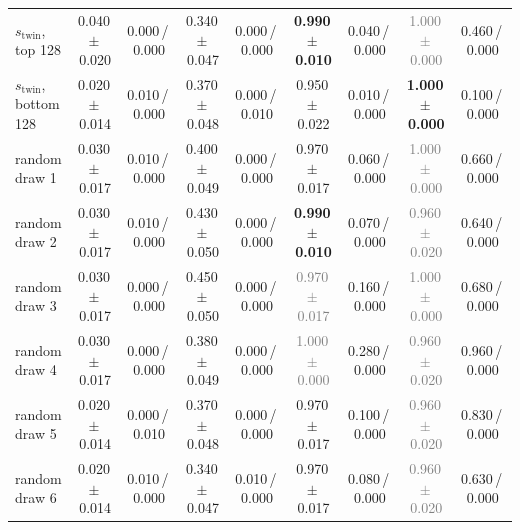 \begin{tabular}{@{}lcccccccc@{}}
$s_{\text{twin}}$, top 128 & 0.040\,{\scriptsize$\pm$\,0.020} & {\scriptsize 0.000\,/\,0.000} & 0.340\,{\scriptsize$\pm$\,0.047} & {\scriptsize 0.000\,/\,0.000} & \textbf{0.990\,{\scriptsize$\pm$\,0.010}} & {\scriptsize 0.040\,/\,0.000} & \textcolor{gray}{1.000\,{\scriptsize$\pm$\,0.000}} & {\scriptsize 0.460\,/\,0.000} \\
$s_{\text{twin}}$, bottom 128 & 0.020\,{\scriptsize$\pm$\,0.014} & {\scriptsize 0.010\,/\,0.000} & 0.370\,{\scriptsize$\pm$\,0.048} & {\scriptsize 0.000\,/\,0.010} & 0.950\,{\scriptsize$\pm$\,0.022} & {\scriptsize 0.010\,/\,0.000} & \textbf{1.000\,{\scriptsize$\pm$\,0.000}} & {\scriptsize 0.100\,/\,0.000} \\
\midrule
random draw 1 & 0.030\,{\scriptsize$\pm$\,0.017} & {\scriptsize 0.010\,/\,0.000} & 0.400\,{\scriptsize$\pm$\,0.049} & {\scriptsize 0.000\,/\,0.000} & 0.970\,{\scriptsize$\pm$\,0.017} & {\scriptsize 0.060\,/\,0.000} & \textcolor{gray}{1.000\,{\scriptsize$\pm$\,0.000}} & {\scriptsize 0.660\,/\,0.000} \\
random draw 2 & 0.030\,{\scriptsize$\pm$\,0.017} & {\scriptsize 0.010\,/\,0.000} & 0.430\,{\scriptsize$\pm$\,0.050} & {\scriptsize 0.000\,/\,0.000} & \textbf{0.990\,{\scriptsize$\pm$\,0.010}} & {\scriptsize 0.070\,/\,0.000} & \textcolor{gray}{0.960\,{\scriptsize$\pm$\,0.020}} & {\scriptsize 0.640\,/\,0.000} \\
random draw 3 & 0.030\,{\scriptsize$\pm$\,0.017} & {\scriptsize 0.000\,/\,0.000} & 0.450\,{\scriptsize$\pm$\,0.050} & {\scriptsize 0.000\,/\,0.000} & \textcolor{gray}{0.970\,{\scriptsize$\pm$\,0.017}} & {\scriptsize 0.160\,/\,0.000} & \textcolor{gray}{1.000\,{\scriptsize$\pm$\,0.000}} & {\scriptsize 0.680\,/\,0.000} \\
random draw 4 & 0.030\,{\scriptsize$\pm$\,0.017} & {\scriptsize 0.000\,/\,0.000} & 0.380\,{\scriptsize$\pm$\,0.049} & {\scriptsize 0.000\,/\,0.000} & \textcolor{gray}{1.000\,{\scriptsize$\pm$\,0.000}} & {\scriptsize 0.280\,/\,0.000} & \textcolor{gray}{0.960\,{\scriptsize$\pm$\,0.020}} & {\scriptsize 0.960\,/\,0.000} \\
\midrule
random draw 5 & 0.020\,{\scriptsize$\pm$\,0.014} & {\scriptsize 0.000\,/\,0.010} & 0.370\,{\scriptsize$\pm$\,0.048} & {\scriptsize 0.000\,/\,0.000} & 0.970\,{\scriptsize$\pm$\,0.017} & {\scriptsize 0.100\,/\,0.000} & \textcolor{gray}{0.960\,{\scriptsize$\pm$\,0.020}} & {\scriptsize 0.830\,/\,0.000} \\
random draw 6 & 0.020\,{\scriptsize$\pm$\,0.014} & {\scriptsize 0.010\,/\,0.000} & 0.340\,{\scriptsize$\pm$\,0.047} & {\scriptsize 0.010\,/\,0.000} & 0.970\,{\scriptsize$\pm$\,0.017} & {\scriptsize 0.080\,/\,0.000} & \textcolor{gray}{0.960\,{\scriptsize$\pm$\,0.020}} & {\scriptsize 0.630\,/\,0.000} \\

\end{tabular}
